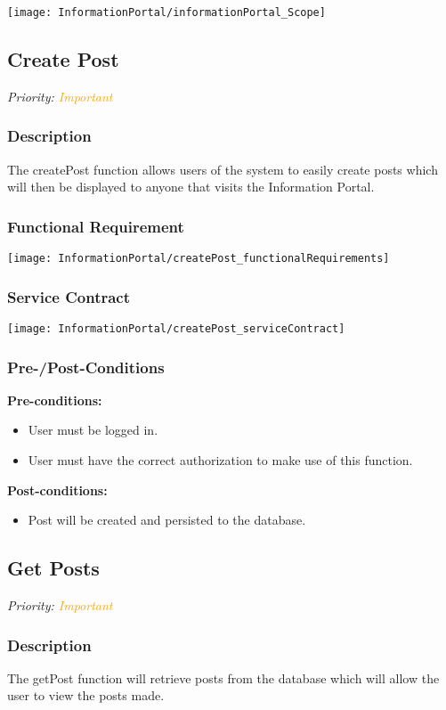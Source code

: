 
\texttt{[image: InformationPortal/informationPortal\_Scope]}

\subsection{Create Post}
\textit{Priority: \textcolor{orange}{Important}}

\subsubsection{Description}
The createPost function allows users of the system to easily create posts which will then be displayed to anyone that visits the Information Portal.
	
\subsubsection{Functional Requirement}
\texttt{[image: InformationPortal/createPost\_functionalRequirements]}

\subsubsection{Service Contract}
\texttt{[image: InformationPortal/createPost\_serviceContract]}

\subsubsection{Pre-/Post-Conditions}
	\textbf{Pre-conditions:}
	\begin{itemize}
		\item User must be logged in.
		\item User must have the correct authorization to make use of this function.
	\end{itemize}
	\textbf{Post-conditions:}
	\begin{itemize}
		\item Post will be created and persisted to the database.
	\end{itemize}

\subsection{Get Posts}
\textit{Priority: \textcolor{orange}{Important}}

\subsubsection{Description}
The getPost function will retrieve posts from the database which will allow the user to view the posts made.

